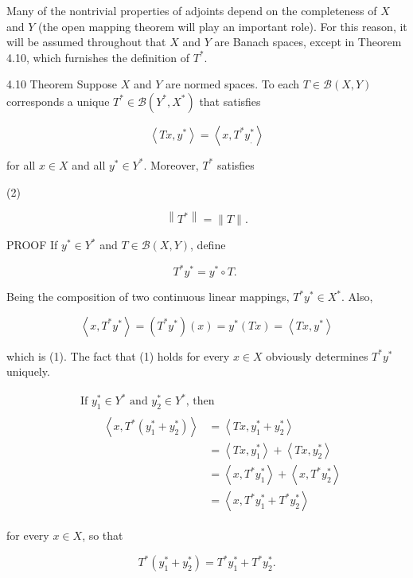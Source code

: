 \documentclass[10pt]{article}
\begin{document}
Many of the nontrivial properties of adjoints depend on the completeness of $X$ and $Y$ (the open mapping theorem will play an important role). For this reason, it will be assumed throughout that $X$ and $Y$ are Banach spaces, except in Theorem 4.10, which furnishes the definition of $T^{*}$.

4.10 Theorem Suppose $X$ and $Y$ are normed spaces. To each $T \in \mathscr{B}(X, Y)$ corresponds a unique $T^{*} \in \mathscr{B}\left(Y^{*}, X^{*}\right)$ that satisfies

$$
\left\langle T x, y^{*}\right\rangle=\left\langle x, T^{*} y_{.}^{*}\right\rangle
$$

for all $x \in X$ and all $y^{*} \in Y^{*}$. Moreover, $T^{*}$ satisfies

(2)

$$
\left\|T^{*}\right\|=\|T\| .
$$

PROOF If $y^{*} \in Y^{*}$ and $T \in \mathscr{B}(X, Y)$, define

$$
T^{*} y^{*}=y^{*} \circ T \text {. }
$$

Being the composition of two continuous linear mappings, $T^{*} y^{*} \in X^{*}$. Also,

$$
\left\langle x, T^{*} y^{*}\right\rangle=\left(T^{*} y^{*}\right)(x)=y^{*}(T x)=\left\langle T x, y^{*}\right\rangle
$$

which is (1). The fact that (1) holds for every $x \in X$ obviously determines $T^{*} y^{*}$ uniquely.

$$
\begin{aligned}
& \text { If } y_{1}^{*} \in Y^{*} \text { and } y_{2}^{*} \in Y^{*} \text {, then } \\
& \qquad \begin{aligned}
\left\langle x, T^{*}\left(y_{1}^{*}+y_{2}^{*}\right)\right\rangle & =\left\langle T x, y_{1}^{*}+y_{2}^{*}\right\rangle \\
& =\left\langle T x, y_{1}^{*}\right\rangle+\left\langle T x, y_{2}^{*}\right\rangle \\
& =\left\langle x, T^{*} y_{1}^{*}\right\rangle+\left\langle x, T^{*} y_{2}^{*}\right\rangle \\
& =\left\langle x, T^{*} y_{1}^{*}+T^{*} y_{2}^{*}\right\rangle
\end{aligned}
\end{aligned}
$$

for every $x \in X$, so that

$$
T^{*}\left(y_{1}^{*}+y_{2}^{*}\right)=T^{*} y_{1}^{*}+T^{*} y_{2}^{*} .
$$
\end{document}
